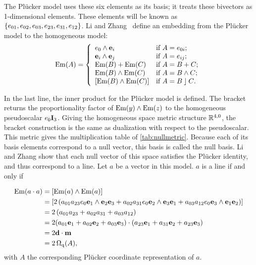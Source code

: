 The Pl\"ucker model uses these six elements as its basis; it treats these bivectors as 1-dimensional elements.  These elements will be known as $\{e_{01}, e_{02}, e_{03}, e_{23}, e_{31}, e_{12}\}$.  Li and Zhang~\cite{Hongbo} define an embedding from the Pl\"ucker model to the homogeneous model:
\begin{equation} \label{eq:Em}
  \operatorname{Em}(A) = \left\{ 
    \begin{array}{ll}
      e_0 \wedge \mathbf{e}_i &\mbox{if $A = e_{0i}$}; \\
      \mathbf{e}_i \wedge \mathbf{e}_j &\mbox{if $A = e_{ij}$}; \\
      \operatorname{Em}(B) + \operatorname{Em}(C) &\mbox{if $A = B + C$}; \\
      \operatorname{Em}(B) \wedge \operatorname{Em}(C) &\mbox{if $A = B \wedge C$}; \\
      \left[\operatorname{Em}(B) \wedge \operatorname{Em}(C)\right] &\mbox{if $A = B \mathbin{\rfloor} C$}. \\
    \end{array}
    \right.
\end{equation}

In the last line, the inner product for the Pl\"ucker model is defined.  The bracket returns the proportionality factor of $\operatorname{Em}(y) \wedge \operatorname{Em}(z)$ to the homogeneous pseudoscalar $e_0\mathbf{I}_3$.  Giving the homogeneous space metric structure $\mathbb{R}^{4,0}$, the bracket construction is the same as dualization with respect to the pseudoscalar.  This metric gives the multiplication table of \autoref{tab:nullmetric}.  Because each of its basis elements correspond to a null vector, this basis is called the null basis.  Li and Zhang show that each null vector of this space satisfies the Pl\"ucker identity, and thus correspond to a line.  Let $a$ be a vector in this model.  $a$ is a line if and only if

\begin{align*}
  \operatorname{Em}(a \mathbin{\cdot} a) &= \left[\operatorname{Em}(a) \wedge \operatorname{Em}(a)\right] \\
    &= \left[ 2 \left( a_{01} a_{23} e_0\mathbf{e}_1 \wedge \mathbf{e}_2\mathbf{e}_3 + a_{02} a_{31} e_0\mathbf{e}_2 \wedge \mathbf{e}_3\mathbf{e}_1 + a_{03} a_{12} e_0\mathbf{e}_3 \wedge \mathbf{e}_1\mathbf{e}_2 \right) \right] \\
    &= 2 \left( a_{01} a_{23} + a_{02} a_{31} + a_{03} a_{12} \right) \\
    &= 2 (a_{01} \mathbf{e}_1 + a_{02} \mathbf{e}_2 + a_{03} \mathbf{e}_3) \mathbin{\cdot} (a_{23} \mathbf{e}_1 + a_{31} \mathbf{e}_2 + a_{23} \mathbf{e}_3) \\
    &= 2 \mathbf{d} \mathbin{\cdot} \mathbf{m} \\ 
    &= 2 \operatorname{\Omega_q}(A),
\end{align*}
with $A$ the corresponding Pl\"ucker coordinate representation of $a$.

